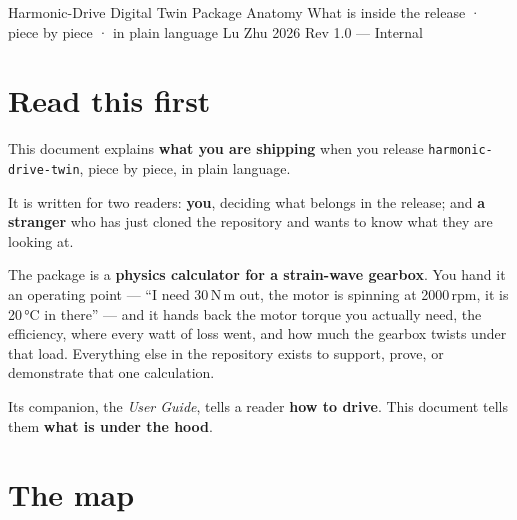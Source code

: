 \documentclass[11pt,a4paper]{article}
\newcommand{\pkg}[1]{\texttt{#1}}
\begin{document}
\schaefflertitlepage
  {Harmonic-Drive Digital Twin}
  {Package Anatomy}
  {What is inside the release · piece by piece · in plain language}
  {Lu Zhu}
  {2026}
  {Rev 1.0 — Internal}

\tableofcontents
\clearpage

\section{Read this first}

This document explains \textbf{what you are shipping} when you release
\pkg{harmonic-drive-twin}, piece by piece, in plain language.

It is written for two readers: \textbf{you}, deciding what belongs in the
release; and \textbf{a stranger} who has just cloned the repository and wants
to know what they are looking at.

\begin{keyresult}
The package is a \textbf{physics calculator for a strain-wave gearbox}. You
hand it an operating point --- ``I need 30\,N\,m out, the motor is spinning at
2000\,rpm, it is 20\,°C in there'' --- and it hands back the motor torque you
actually need, the efficiency, where every watt of loss went, and how much the
gearbox twists under that load. Everything else in the repository exists to
support, prove, or demonstrate that one calculation.
\end{keyresult}

Its companion, the \emph{User Guide}, tells a reader \textbf{how to drive}.
This document tells them \textbf{what is under the hood}.

\section{The map}
\end{document}
